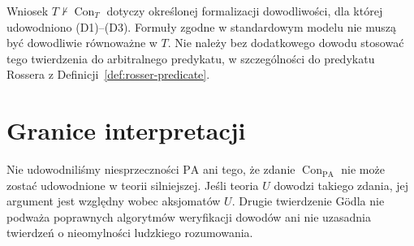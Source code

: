 \begin{uwaga}
Wniosek $T\nvdash\operatorname{Con}_T$
dotyczy określonej formalizacji dowodliwości,
dla której udowodniono (D1)--(D3).
Formuły zgodne w standardowym modelu nie muszą
być dowodliwie równoważne w $T$.
Nie należy bez dodatkowego dowodu stosować
tego twierdzenia do arbitralnego predykatu,
w szczególności do predykatu Rossera
z Definicji~\ref{def:rosser-predicate}.
\end{uwaga}

\section{Granice interpretacji}
\begin{uwaga}
Nie udowodniliśmy niesprzeczności $\mathrm{PA}$
ani tego, że zdanie
$\operatorname{Con}_{\mathrm{PA}}$
nie może zostać udowodnione w teorii silniejszej.
Jeśli teoria $U$ dowodzi takiego zdania, jej
argument jest względny wobec aksjomatów $U$.
Drugie twierdzenie Gödla nie podważa poprawnych
algorytmów weryfikacji dowodów ani nie uzasadnia
twierdzeń o nieomylności ludzkiego rozumowania.
\end{uwaga}
